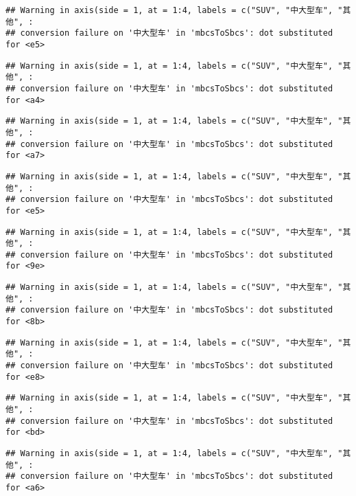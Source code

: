 \documentclass[]{article}
\begin{document}
\begin{verbatim}
## Warning in axis(side = 1, at = 1:4, labels = c("SUV", "中大型车", "其他", :
## conversion failure on '中大型车' in 'mbcsToSbcs': dot substituted for <e5>
\end{verbatim}

\begin{verbatim}
## Warning in axis(side = 1, at = 1:4, labels = c("SUV", "中大型车", "其他", :
## conversion failure on '中大型车' in 'mbcsToSbcs': dot substituted for <a4>
\end{verbatim}

\begin{verbatim}
## Warning in axis(side = 1, at = 1:4, labels = c("SUV", "中大型车", "其他", :
## conversion failure on '中大型车' in 'mbcsToSbcs': dot substituted for <a7>
\end{verbatim}

\begin{verbatim}
## Warning in axis(side = 1, at = 1:4, labels = c("SUV", "中大型车", "其他", :
## conversion failure on '中大型车' in 'mbcsToSbcs': dot substituted for <e5>
\end{verbatim}

\begin{verbatim}
## Warning in axis(side = 1, at = 1:4, labels = c("SUV", "中大型车", "其他", :
## conversion failure on '中大型车' in 'mbcsToSbcs': dot substituted for <9e>
\end{verbatim}

\begin{verbatim}
## Warning in axis(side = 1, at = 1:4, labels = c("SUV", "中大型车", "其他", :
## conversion failure on '中大型车' in 'mbcsToSbcs': dot substituted for <8b>
\end{verbatim}

\begin{verbatim}
## Warning in axis(side = 1, at = 1:4, labels = c("SUV", "中大型车", "其他", :
## conversion failure on '中大型车' in 'mbcsToSbcs': dot substituted for <e8>
\end{verbatim}

\begin{verbatim}
## Warning in axis(side = 1, at = 1:4, labels = c("SUV", "中大型车", "其他", :
## conversion failure on '中大型车' in 'mbcsToSbcs': dot substituted for <bd>
\end{verbatim}

\begin{verbatim}
## Warning in axis(side = 1, at = 1:4, labels = c("SUV", "中大型车", "其他", :
## conversion failure on '中大型车' in 'mbcsToSbcs': dot substituted for <a6>
\end{verbatim}
\end{document}
